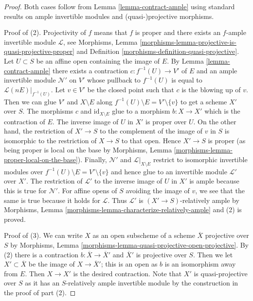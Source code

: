 \begin{proof}
Both cases follow from Lemma \ref{lemma-contract-ample}
using standard results on ample invertible modules and
(quasi-)projective morphisms.

\medskip\noindent
Proof of (2). Projectivity of $f$ means that $f$ is proper and there exists
an $f$-ample invertible module $\mathcal{L}$, see
Morphisms, Lemma \ref{morphisms-lemma-projective-is-quasi-projective-proper}
and Definition \ref{morphisms-definition-quasi-projective}.
Let $U \subset S$ be an affine open containing the image of $E$.
By Lemma \ref{lemma-contract-ample} there exists a contraction
$c : f^{-1}(U) \to V'$ of $E$ and an ample invertible module
$\mathcal{N}'$ on $V'$ whose pullback to $f^{-1}(U)$ is equal to
$\mathcal{L}(nE)|_{f^{-1}(U)}$. Let $v \in V'$ be the closed point
such that $c$ is the blowing up of $v$.
Then we can glue $V'$ and $X \setminus E$ along
$f^{-1}(U) \setminus E = V' \setminus \{v\}$
to get a scheme $X'$ over $S$. The morphisms $c$ and
$\text{id}_{X \setminus E}$ glue to a morphism $b : X \to X'$
which is the contraction of $E$. The inverse image of $U$ in $X'$
is proper over $U$. On the other hand, the restriction of $X' \to S$
to the complement of the image of $v$ in $S$ is isomorphic to the
restriction of $X \to S$ to that open. Hence $X' \to S$ is proper
(as being proper is local on the base by
Morphisms, Lemma \ref{morphisms-lemma-proper-local-on-the-base}).
Finally, $\mathcal{N}'$ and $\mathcal{L}|_{X \setminus E}$ restrict to
isomorphic invertible modules over $f^{-1}(U) \setminus E = V' \setminus \{v\}$
and hence glue to an invertible module $\mathcal{L}'$ over $X'$.
The restriction of $\mathcal{L}'$ to the inverse image of $U$
in $X'$ is ample because this is true for $\mathcal{N}'$.
For affine opens of $S$ avoiding the image of $v$, we see that
the same is true because it holds for $\mathcal{L}$.
Thus $\mathcal{L}'$ is $(X' \to S)$-relatively ample by
Morphisms, Lemma \ref{morphisms-lemma-characterize-relatively-ample}
and (2) is proved.

\medskip\noindent
Proof of (3). We can write $X$ as an open subscheme of a scheme
$\overline{X}$ projective over $S$ by Morphisms, Lemma
\ref{morphisms-lemma-quasi-projective-open-projective}.
By (2) there is a contraction $b : \overline{X} \to \overline{X}'$
and $\overline{X}'$ is projective over $S$. Then we let
$X' \subset \overline{X}$ be the image of $X \to \overline{X}'$;
this is an open as $b$ is an isomorphism away from $E$.
Then $X \to X'$ is the desired contraction. Note that
$X'$ is quasi-projective over $S$ as it has an
$S$-relatively ample invertible module
by the construction in the proof of part (2).
\end{proof}

